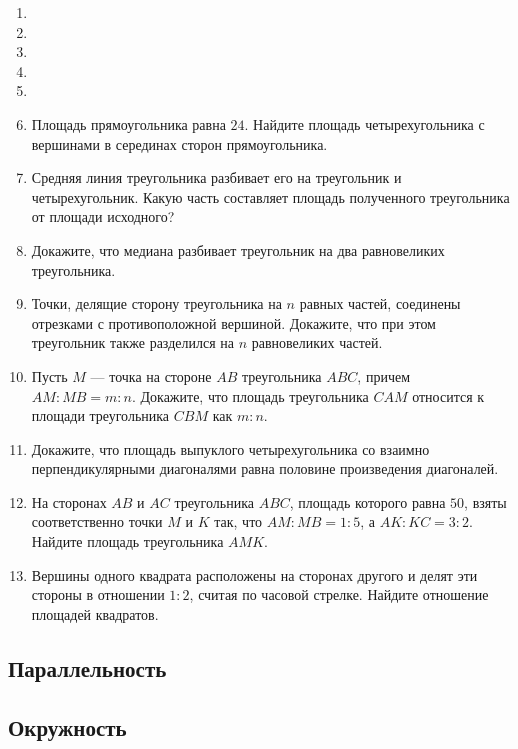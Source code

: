 \documentclass[10pt, a4paper]{article}
\begin{document}
\begin{enumerate}
		\item {} 
		\item {} 
		\item {} 
		\item {} 
		\item {} 
		\item Площадь прямоугольника равна $24$. Найдите площадь четырехугольника с вершинами в серединах сторон прямоугольника.
		\item Средняя линия треугольника разбивает его на треугольник и четырехугольник. Какую часть составляет площадь полученного треугольника от площади исходного?
		\item Докажите, что медиана разбивает треугольник на два равновеликих треугольника.
		\item Точки, делящие сторону треугольника на $n$ равных частей, соединены отрезками с противоположной вершиной. Докажите, что при этом треугольник также разделился на $n$ равновеликих частей.
		\item Пусть $M$ — точка на стороне $AB$ треугольника $ABC$, причем $AM : MB = m : n$. Докажите, что площадь треугольника $CAM$ относится к площади треугольника $CBM$ как $m : n$.
		\item Докажите, что площадь выпуклого четырехугольника со взаимно перпендикулярными диагоналями равна половине произведения диагоналей.
		\item На сторонах $AB$ и $AC$ треугольника $ABC$, площадь которого равна $50$, взяты соответственно точки $M$ и $K$ так, что $AM : MB = 1 : 5$, а $AK : KC = 3 : 2$. Найдите площадь треугольника $AMK$.
		\item Вершины одного квадрата расположены на сторонах другого и делят эти стороны в отношении $1 : 2$, считая по часовой стрелке. Найдите отношение площадей квадратов.
	\end{enumerate}
\subsection{Параллельность}
\subsection{Окружность}
\end{document}
